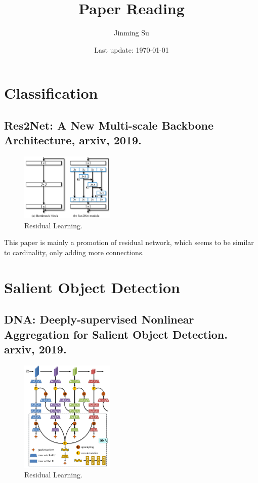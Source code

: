 \documentclass[10pt,onecolumn]{book}
\begin{document}
\title{\textbf{Paper Reading}}
\author{Jinming Su}
\date{Last update: \today}

\maketitle

\thispagestyle{empty}
\newpage
{}
\newpage
\tableofcontents
\newpage
\listoftodos

\newpage
{}
\mainmatter

\chapter{Classification}
\section{Res2Net: A New Multi-scale Backbone Architecture, arxiv, 2019.}
\begin{figure}[h]
\centering
\includegraphics[width=0.4\textwidth]{figures_paper_reading/Res2Net:_A_New_Multi-scale_Backbone_Architecture.png}
\caption{Residual Learning.}
\label{fig:1-1_residual_learning}
\end{figure}
This paper is mainly a promotion of residual network, which seems to be similar to cardinality, only adding more connections.

\chapter{Salient Object Detection}
\section{DNA: Deeply-supervised Nonlinear Aggregation for Salient Object Detection. arxiv, 2019.}
\begin{figure}[h]
\centering
\includegraphics[width=0.4\textwidth]{figures_paper_reading/DNA_Deeply-supervised_Nonlinear_Aggregation_for_Salient_Object_Detection.png}
\caption{Residual Learning.}
\label{fig:1-1_residual_learning}
\end{figure}
\end{document}
